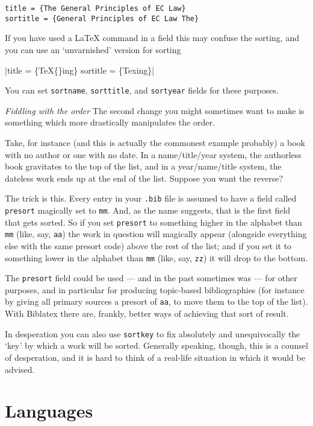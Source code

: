 \begin{verbatim}
title = {The General Principles of EC Law}
sortitle = {General Principles of EC Law The}
\end{verbatim}

  If you have used a LaTeX command in a field this may confuse the
  sorting, and you can use an `unvarnished' version for sorting

  |title = \{\TeX\{\}ing\} sortitle = \{Texing\}|

You can set \texttt{sortname}, \texttt{sorttitle}, and \texttt{sortyear}
fields for these purposes.

\emph{Fiddling with the order} The second change you might sometimes
want to make is something which more drastically manipulates the order.

Take, for instance (and this is actually the commonest example probably)
a book with no author or one with no date. In a name/title/year system,
the authorless book gravitates to the top of the list, and in a
year/name/title system, the dateless work ends up at the end of the
list. Suppose you want the reverse?

The trick is this. Every entry in your \texttt{.bib} file is assumed to
have a field called \texttt{presort} magically set to \texttt{mm}. And,
as the name suggests, that is the first field that gets sorted. So if
you set \texttt{presort} to something higher in the alphabet than
\texttt{mm} (like, say, \texttt{aa}) the work in question will magically
appear (alongside everything else with the same presort code) above the
rest of the list; and if you set it to something lower in the alphabet
than \texttt{mm} (like, say, \texttt{zz}) it will drop to the bottom.

The \texttt{presort} field could be used --- and in the past sometimes
was --- for other purposes, and in particular for producing topic-based
bibliographies (for instance by giving all primary sources a presort of
\texttt{aa}, to move them to the top of the list). With Biblatex there
are, frankly, better ways of achieving that sort of result.

In desperation you can also use \texttt{sortkey} to fix absolutely and
unequivocally the `key' by which a work will be sorted. Generally
speaking, though, this is a counsel of desperation, and it is hard to
think of a real-life situation in which it would be advised.

\section{Languages}

